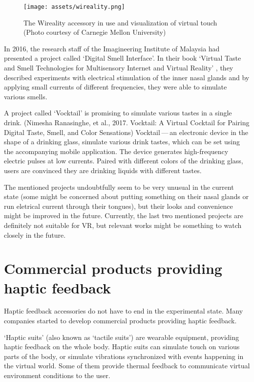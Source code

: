 \begin{figure}[h]{}
\centering\texttt{[image: assets/wireality.png]}
\caption{The Wireality accessory in use and visualization of virtual touch (Photo courtesy of Carnegie Mellon University)}
\end{figure}

In 2016, the research staff of the Imagineering Institute of Malaysia
had presented a project called `Digital Smell Interface'. In their book
`Virtual Taste and Smell Technologies for Multisensory Internet and Virtual
Reality' \cite{vrstmivr}, they described experiments with electrical stimulation
of the inner nasal glands and by applying small currents of different
frequencies, they were able to simulate various smells.


A project called `Vocktail' is promising to simulate various tastes in a single
drink.
(Nimesha Ranasinghe, et al., 2017. Vocktail: A Virtual Cocktail for Pairing
Digital Taste, Smell, and Color Sensations) \cite{vocktail} Vocktail — an electronic
device in the shape of a drinking glass, simulate various drink tastes,
which can be set using the accompanying mobile application. The device
generates high-frequency electric pulses at low currents. Paired with
different colors of the drinking glass, users are convinced they are drinking
liquids with different tastes.


The mentioned projects undoubtfully seem to be very unusual in the current state
(some might be concerned about putting something on their nasal glands or run
eletrical current through their tongues), but their looks and convenience
might be improved in the future. Currently, the last two mentioned projects 
are definitely not suitable for VR, but relevant works might be something to
watch closely in the future.


\hypertarget{x-commercial-products-providing-haptic-feedback}{\section{Commercial products providing haptic feedback}}
Haptic feedback accessories do not have to end in the experimental state.
Many companies started to develop commercial products providing haptic feedback.


`Haptic suits' (also known as `tactile suits') are wearable
equipment, providing haptic feedback on the whole body. Haptic suits can 
simulate touch on various parts of the body, or simulate
vibrations synchronized with events happening in the virtual world. Some
of them provide thermal feedback to communicate virtual environment
conditions to the user.

